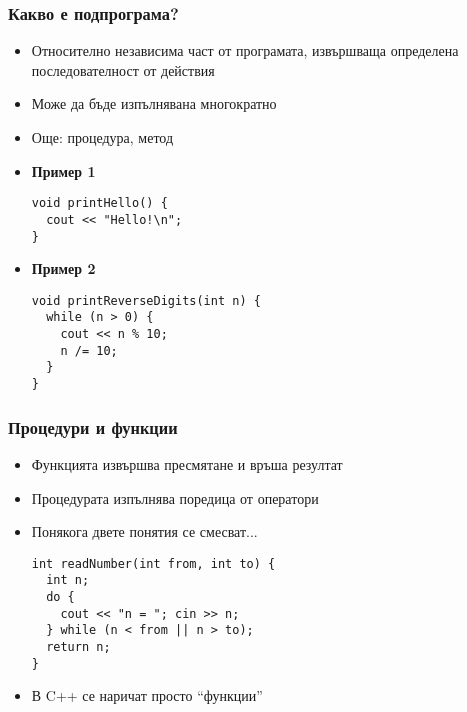 \documentclass{beamer}
\begin{document}
\begin{frame}[fragile]
  \frametitle{Какво е подпрограма?}

  \begin{itemize}[<+->]
  \item Относително независима част от програмата, извършваща определена последователност от действия
  \item Може да бъде изпълнявана многократно
  \item Още: процедура, метод
  \item \textbf{Пример 1}
\begin{lstlisting}
void printHello() {
  cout << "Hello!\n";
}
\end{lstlisting}
  \item \textbf{Пример 2}
\begin{lstlisting}
void printReverseDigits(int n) {
  while (n > 0) {
    cout << n % 10;
    n /= 10;
  }
}
\end{lstlisting}
  \end{itemize}
\end{frame}

\begin{frame}[fragile]
  \frametitle{Процедури и функции}

  \begin{itemize}[<+->]
  \item Функцията извършва пресмятане и връша резултат
  \item Процедурата изпълнява поредица от оператори
  \item Понякога двете понятия се смесват...
\begin{lstlisting}
int readNumber(int from, int to) {
  int n;
  do {
    cout << "n = "; cin >> n;
  } while (n < from || n > to);
  return n;
}
\end{lstlisting}
  \item В C++ се наричат просто ``функции''
  \end{itemize}
\end{frame}
\end{document}
